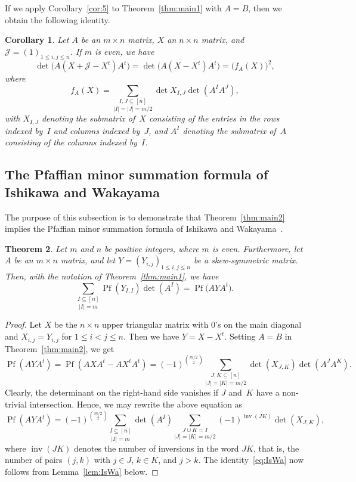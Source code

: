 \documentclass[12pt,reqno]{amsart}
\numberwithin{equation}{section}
\newtheorem{theorem}{Theorem}
\newtheorem{corollary}[theorem]{Corollary}
\theoremstyle{definition}
\theoremstyle{remark}
\def\Pf{\operatorname{Pf}}
\def\inv{\operatorname{inv}}
\def\J{\mathcal J}
\begin{document}
If we apply Corollary~\ref{cor:5} to
Theorem~\ref{thm:main1} with $A=B$, then we obtain
the following identity.


\begin{corollary} \label{cor:7}
Let $A$ be an $m\times n$ matrix,
$X$ an $n\times n$ matrix, and
$\J =(1)_{1\le i,j\le n}$. If $m$ is even, we have
$$
\det\bigl(A(X+\J -X^t)A^t\bigr)      
=\det\bigl(A(X-X^t)A^t\bigr)
=\bigl(f_{A}(X)\bigr)^2,
$$
where
$$
f_{A}(X)=\underset {|I|=|J|=m/2}{\sum_{I,J\subseteq[n]}}
\det X_{I,J} \det(A^IA^J),
$$
with $X_{I,J}$ denoting the submatrix of~$X$ consisting of the entries
in the
rows indexed by~$I$ and columns indexed by~$J$, and $A^I$ denoting
the submatrix of~$A$ consisting of the columns indexed by~$I$.
\end{corollary}

\subsection{The Pfaffian minor summation formula of Ishikawa and
Wakayama}
\label{sec:IsWa}

The purpose of this subsection is to demonstrate that
Theorem~\ref{thm:main2} implies the Pfaffian minor summation formula
of Ishikawa and Wakayama~\cite[Theorem~1 with $q=1$]{IsWaAA}.

\begin{theorem} \label{thm:IsWa}
Let $m$ and $n$ be positive integers, where $m$ is even.
Furthermore, let $A$ be an $m\times n$ matrix, and let
$Y=(Y_{i,j})_{1\le i,j\le n}$ be a
skew-symmetric matrix. Then, with the notation of
Theorem~\ref{thm:main1}, we have
\begin{equation} \label{eq:IsWa} 
\underset{|I|=m}{\sum_{I\subseteq[n]}}
\Pf(Y_{I,I}) \det (A^I)
 =
\Pf\bigl(AYA^t\bigr).
\end{equation}
\end{theorem}

\begin{proof}
Let $X$ be the $n\times n$ upper triangular matrix with 0's on the
main diagonal and $X_{i,j}=Y_{i,j}$ for $1\le i<j\le n$.
Then we have $Y=X-X^t$.
Setting $A=B$ in Theorem~\ref{thm:main2}, we get 
$$
\Pf (AYA^t)=
\Pf (AXA^t-AX^tA^t)
=(-1)^{\binom {m/2}2}
\underset {|J|=|K|=m/2}{\sum_{J,K\subseteq[n]}}
\det (X_{J,K}) \det(A^JA^K).
$$
Clearly, the determinant on the right-hand side vanishes if
$J$ and~$K$ have a non-trivial intersection. Hence, we may rewrite the
above equation as
$$
\Pf (AYA^t)
=(-1)^{\binom {m/2}2}
\underset {|I|=m}{\sum_{I\subseteq[n]}}
\det(A^I)\underset{|J|=|K|=m/2}{\sum_{J\cup K=I}}
(-1)^{\inv(JK)}\det (X_{J,K} ),
$$
where $\inv(JK)$ denotes the number of inversions in the word $JK$,
that is, the number of pairs $(j,k)$ with $j\in J$, $k\in K$, and
$j>k$. The identity~\eqref{eq:IsWa} now follows from
Lemma~\ref{lem:IsWa} below.
\end{proof}
\end{document}
